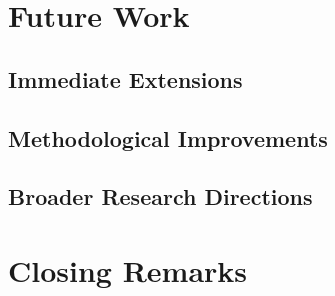 \section{Future Work}

\subsection{Immediate Extensions}

\subsection{Methodological Improvements}

\subsection{Broader Research Directions}

\section{Closing Remarks}
